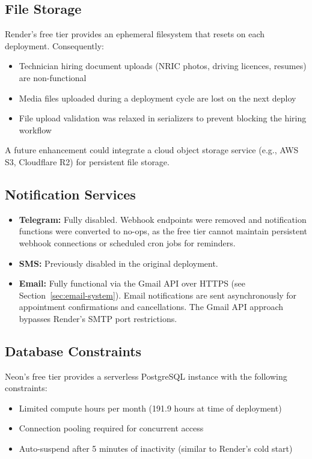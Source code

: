 \documentclass[conference]{IEEEtran}
\begin{document}
\subsection{File Storage}

Render's free tier provides an ephemeral filesystem that resets on each deployment. Consequently:
\begin{itemize}
    \item Technician hiring document uploads (NRIC photos, driving licences, resumes) are non-functional
    \item Media files uploaded during a deployment cycle are lost on the next deploy
    \item File upload validation was relaxed in serializers to prevent blocking the hiring workflow
\end{itemize}

A future enhancement could integrate a cloud object storage service (e.g., AWS S3, Cloudflare R2) for persistent file storage.

\subsection{Notification Services}

\begin{itemize}
    \item \textbf{Telegram:} Fully disabled. Webhook endpoints were removed and notification functions were converted to no-ops, as the free tier cannot maintain persistent webhook connections or scheduled cron jobs for reminders.
    \item \textbf{SMS:} Previously disabled in the original deployment.
    \item \textbf{Email:} Fully functional via the Gmail API over HTTPS (see Section~\ref{sec:email-system}). Email notifications are sent asynchronously for appointment confirmations and cancellations. The Gmail API approach bypasses Render's SMTP port restrictions.
\end{itemize}

\subsection{Database Constraints}

Neon's free tier \cite{b4} provides a serverless PostgreSQL instance with the following constraints:
\begin{itemize}
    \item Limited compute hours per month (191.9 hours at time of deployment)
    \item Connection pooling required for concurrent access
    \item Auto-suspend after 5 minutes of inactivity (similar to Render's cold start)
\end{itemize}
\end{document}
